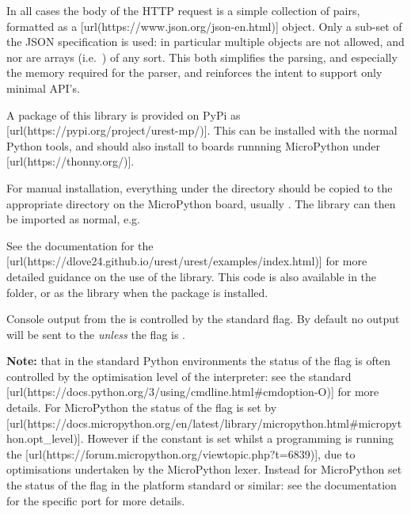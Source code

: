 In all cases the body of the HTTP request is a simple collection of
 pairs, formatted as a
[url(https://www.json.org/json-en.html)] object. Only a
sub-set of the JSON specification is used: in particular multiple
objects are not allowed, and nor are arrays (i.e.~\quote{\type{[]}}) of
any sort. This both simplifies the parsing, and especially the memory
required for the parser, and reinforces the intent to support only
minimal API's.

\stopsection

\startsection[title={Installation}]

A package of this library is provided on PyPi as
[url(https://pypi.org/project/urest-mp/)]. This
can be installed with the normal Python tools, and should also install
to boards runnning MicroPython under
[url(https://thonny.org/)].

For manual installation, everything under the  directory
should be copied to the appropriate directory on the MicroPython board,
usually . The library can then be imported as normal, e.g.


See the documentation for the
[url(https://dlove24.github.io/urest/urest/examples/index.html)]
for more detailed guidance on the use of the library. This code is also
available in the  folder, or as the library
 when the package is installed.

\stopsection

\startsection[title={Debugging}]

Console output from the  is
controlled by the standard  flag. By default no output
will be sent to the  {\em unless} the 
flag is .

{\bf Note:} that in the standard Python environments the status of the
 flag is often controlled by the optimisation level of
the interpreter: see the standard [url(https://docs.python.org/3/using/cmdline.html\#cmdoption-O)]
for more details. For MicroPython the status of the 
flag is set by [url(https://docs.micropython.org/en/latest/library/micropython.html\#micropython.opt_level)].
However if the  constant is set whilst a programming is
running the [url(https://forum.micropython.org/viewtopic.php?t=6839)],
due to optimisations undertaken by the MicroPython lexer. Instead for
MicroPython set the status of the  flag in the platform
standard  or similar: see the documentation for the
specific port for more details.

